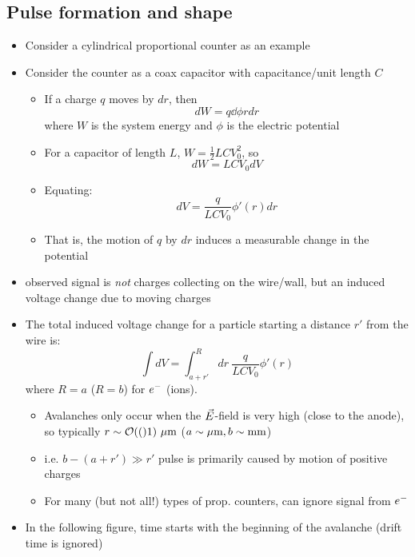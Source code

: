 \subsection{Pulse formation and shape}
\begin{itemize}
  \item Consider a cylindrical proportional counter as an example
  \item Consider the counter as a coax capacitor with capacitance/unit length $C$
  \begin{itemize}
    \item If a charge $q$ moves by $dr$, then 
    \begin{equation}
      dW = q\dd{\phi}{r} dr
    \end{equation}
    where $W$ is the system energy and $\phi$ is the electric potential
    \item For a capacitor of length $L$, $W = \frac{1}{2}LCV_0^2$, so
    \begin{equation}
      dW = LCV_0 dV
    \end{equation}
    \item Equating:
    \begin{equation}
      dV = \frac{q}{LCV_0}\phi'(r) dr
    \end{equation}
    \item That is, the motion of $q$ by $dr$ induces a measurable change in the potential 
  \end{itemize}
  \item \thus observed signal is \emph{not} charges collecting on the wire/wall, but an induced voltage change due to moving charges
  \item The total induced voltage change for a particle starting a distance $r'$ from the wire is:
  \begin{equation}
    \int dV = \int_{a+r'}^{R} dr~\frac{q}{LCV_0}\phi'(r)
  \end{equation}
  where $R = a$ ($R=b$) for $e^{-}$ (ions). 
  \begin{itemize}
    \item Avalanches only occur when the $\vec{E}$-field is very high (close to the anode), so typically $r\sim\mathcal{O}(()1)~\mu\text{m}$ ($a\sim\mu\text{m},b\sim\text{mm}$)
    \item i.e. $b-(a+r')\gg r'$ \thus pulse is primarily caused by motion of positive charges
    \item For many (but not all!) types of prop. counters, can ignore signal from $e^{-}$
  \end{itemize}
  \item In the following figure, time starts with the beginning of the avalanche (drift time is ignored)
\end{itemize}

